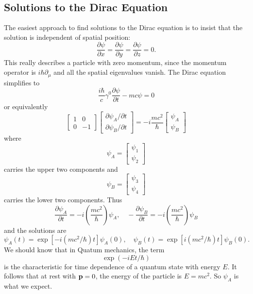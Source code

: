 \subsection{Solutions to the Dirac Equation}

The easiest approach to find solutions to the Dirac equation is to insist that
the solution is independent of spatial position:
\begin{equation}
\frac{\partial\psi}{\partial x} = \frac{\partial\psi}{\partial y} = \frac{\partial\psi}{\partial z} = 0.
\end{equation}
This really describes a particle with zero momentum, since the momentum operator
is $i\hbar\partial_\mu$ and all the spatial eigenvalues vanish. The Dirac 
equation simplifies to
\begin{equation}
\frac{i\hbar}{c}\gamma^0\frac{\partial\psi}{\partial t} - mc\psi = 0
\end{equation}
or equivalently
\begin{equation}
\begin{bmatrix}
1 & 0 \\
0 & -1
\end{bmatrix}
\begin{bmatrix}
\partial\psi_A/\partial t\\
\partial\psi_B/\partial t
\end{bmatrix}
= -i\frac{mc^2}{\hbar}
\begin{bmatrix}
\psi_A \\
\psi_B
\end{bmatrix}
\end{equation}
where
\begin{equation}
\psi_A = \begin{bmatrix}
\psi_1\\
\psi_2
\end{bmatrix}
\end{equation}
carries the upper two components and 
\begin{equation}
\psi_B = \begin{bmatrix}
\psi_3\\
\psi_4
\end{bmatrix}
\end{equation}
carries the lower two components. Thus
\begin{equation}
\frac{\partial\psi_A}{\partial t} = -i\left(\frac{mc^2}{\hbar}\right)\psi_A,\quad -\frac{\partial\psi_B}{\partial t} = -i\left(\frac{mc^2}{\hbar}\right)\psi_B
\end{equation}
and the solutions are
\begin{equation}
\psi_A(t) = \exp[-i(mc^2/\hbar)t]\psi_A(0),\quad\psi_B(t)=\exp[i(mc^2/\hbar)t]\psi_B(0).
\end{equation}
We should know that in Quatum mechanics, the term
\begin{equation}
\exp(-iEt/\hbar)
\end{equation}
is the characteristic for time dependence of a quantum state with energy $E$. It
follows that at rest with $\bold{p}=0$, the energy of the particle is $E=mc^2$.
So $\psi_A$ is what we expect.

